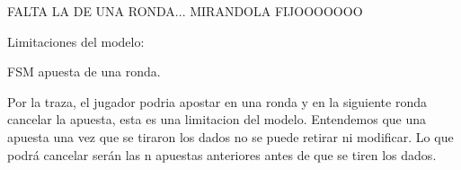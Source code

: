 
FALTA LA DE UNA RONDA... MIRANDOLA FIJOOOOOOO



Limitaciones del modelo:

FSM apuesta de una ronda.

Por la traza, el jugador podria apostar en una ronda y en la siguiente ronda cancelar la apuesta, 
esta es una limitacion del modelo. Entendemos que una apuesta una vez que se tiraron los dados no se puede retirar ni modificar. Lo que podrá cancelar serán las n apuestas anteriores antes de que se tiren los dados.

